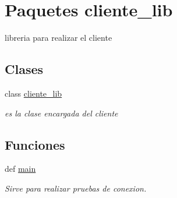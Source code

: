 \hypertarget{namespacecliente__lib}{
\section{Paquetes cliente\_\-lib}
\label{namespacecliente__lib}
}


libreria para realizar el cliente  


\subsection*{Clases}
\begin{DoxyCompactItemize}
\item 
class \hyperlink{classcliente__lib_1_1cliente__lib}{cliente\_\-lib}
\begin{DoxyCompactList}\small\item\em es la clase encargada del cliente \end{DoxyCompactList}\end{DoxyCompactItemize}
\subsection*{Funciones}
\begin{DoxyCompactItemize}
\item 
def \hyperlink{namespacecliente__lib_afb746084e43cb9c21db470d7b4990cae}{main}
\begin{DoxyCompactList}\small\item\em Sirve para realizar pruebas de conexion. \end{DoxyCompactList}\end{DoxyCompactItemize}


